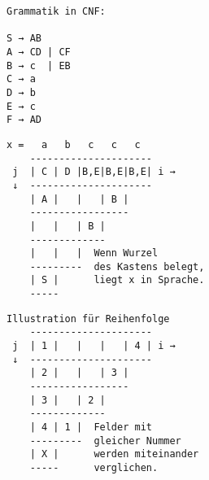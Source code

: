 \documentclass[11pt,
			a4paper,
			parskip=full,
			toc=bib,
			toc=idx,
			toc=listof,
			ngerman
			listof=totoc,]{scrartcl}
\newenvironment{expl}%
{\color{red}}
{\color{black}}
\newcommand{\compress}{\vspace{-1em}}
\begin{document}
\compress
\compress
\begin{expl}
\begin{minipage}[t]{1\linewidth}
  \begin{minipage}[t]{0.2\linewidth}
    \begin{verbatim}
Grammatik in CNF:

S → AB
A → CD | CF
B → c  | EB
C → a
D → b
E → c
F → AD

    \end{verbatim}
  \end{minipage}
  \begin{minipage}[t]{0.4\linewidth}
    \begin{verbatim}
x =   a   b   c   c   c
    ---------------------
 j  | C | D |B,E|B,E|B,E| i → 
 ↓  ---------------------
    | A |   |   | B |    
    -----------------
    |   |   | B |    
    -------------
    |   |   |  Wenn Wurzel	 					 
    ---------  des Kastens belegt,
    | S |      liegt x in Sprache.   
    -----
    \end{verbatim}
  \end{minipage}
  \begin{minipage}[t]{0.4\linewidth}
    \begin{verbatim}
Illustration für Reihenfolge		
    ---------------------
 j  | 1 |   |   |   | 4 | i →
 ↓  ---------------------
    | 2 |   |   | 3 |
    -----------------
    | 3 |   | 2 |
    -------------
    | 4 | 1 |  Felder mit
    ---------  gleicher Nummer
    | X |      werden miteinander   
    -----      verglichen.
    \end{verbatim}
  \end{minipage}
\end{minipage}
\end{expl}





\end{document}
